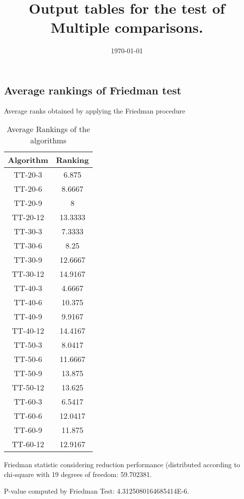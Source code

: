 \documentclass[a4paper,10pt]{article}
\title{Output tables for the test of Multiple comparisons.}
\author{}
\date{\today}
\begin{document}
\begin{landscape}
\pagestyle{empty}
\maketitle
\thispagestyle{empty}
\section{Average rankings of Friedman test}



Average ranks obtained by applying the Friedman procedure

\begin{table}[!htp]
\centering
\begin{tabular}{|c|c|}\hline
Algorithm&Ranking\\\hline
TT-20-3 & 6.875\\
TT-20-6 & 8.6667\\
TT-20-9 & 8\\
TT-20-12 & 13.3333\\
TT-30-3 & 7.3333\\
TT-30-6 & 8.25\\
TT-30-9 & 12.6667\\
TT-30-12 & 14.9167\\
TT-40-3 & 4.6667\\
TT-40-6 & 10.375\\
TT-40-9 & 9.9167\\
TT-40-12 & 14.4167\\
TT-50-3 & 8.0417\\
TT-50-6 & 11.6667\\
TT-50-9 & 13.875\\
TT-50-12 & 13.625\\
TT-60-3 & 6.5417\\
TT-60-6 & 12.0417\\
TT-60-9 & 11.875\\
TT-60-12 & 12.9167\\
\hline
\end{tabular}
\caption{Average Rankings of the algorithms}
\end{table}

Friedman statistic considering reduction performance (distributed according to chi-square with 19 degrees of freedom: 59.702381.

P-value computed by Friedman Test: 4.3125080164685414E-6.\newline




\end{landscape}
\end{document}
